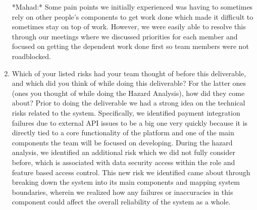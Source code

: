 \documentclass{article}
\begin{document}
\begin{enumerate}
    *Mahad:* Some pain points we initially experienced was having to sometimes rely on other people's components to get work done which made it difficult to sometimes stay on top of work. However, we were easily able to resolve this through our meetings where we discussed priorities for each member and focused on getting the dependent work done first so team members were not roadblocked.


    \item Which of your listed risks had your team thought of before this
    deliverable, and which did you think of while doing this deliverable? For
    the latter ones (ones you thought of while doing the Hazard Analysis), how
    did they come about?
    Prior to doing the deliverable we had a strong idea on the technical risks related to the system. Specifically, we identified payment integration failures due to external API issues to be a big one very quickly because it is directly tied to a core functionality of the platform and one of the main components the team will be focused on developing. During the hazard analysis, we identified an additional risk which we did not fully consider before, which is associated with data security access within the role and feature based access control. This new risk we identified came about through breaking down the system into its main components and mapping system boundaries, wherein we realized how any failures or inaccuracies in this component could affect the overall reliability of the system as a whole.



\end{enumerate}
\end{document}
